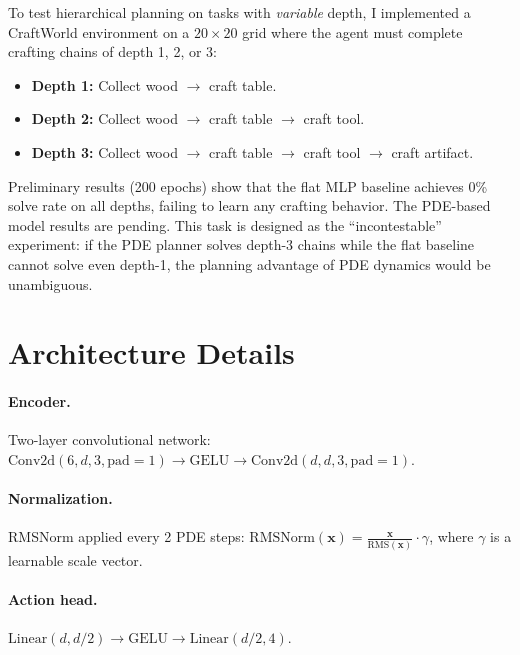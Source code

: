 \documentclass{article}
\begin{document}
\begin{itemize}
To test hierarchical planning on tasks with \emph{variable} depth, I implemented a CraftWorld environment on a $20 \times 20$ grid where the agent must complete crafting chains of depth 1, 2, or 3:

\begin{itemize}
    \item \textbf{Depth 1:} Collect wood $\rightarrow$ craft table.
    \item \textbf{Depth 2:} Collect wood $\rightarrow$ craft table $\rightarrow$ craft tool.
    \item \textbf{Depth 3:} Collect wood $\rightarrow$ craft table $\rightarrow$ craft tool $\rightarrow$ craft artifact.
\end{itemize}

Preliminary results (200 epochs) show that the flat MLP baseline achieves 0\% solve rate on all depths, failing to learn any crafting behavior. The PDE-based model results are pending. This task is designed as the ``incontestable'' experiment: if the PDE planner solves depth-3 chains while the flat baseline cannot solve even depth-1, the planning advantage of PDE dynamics would be unambiguous.

\section{Architecture Details}
\label{app:architecture}

\paragraph{Encoder.} Two-layer convolutional network: $\text{Conv2d}(6, d, 3, \text{pad}=1) \rightarrow \text{GELU} \rightarrow \text{Conv2d}(d, d, 3, \text{pad}=1)$.

\paragraph{Normalization.} RMSNorm applied every 2 PDE steps: $\text{RMSNorm}(\mathbf{x}) = \frac{\mathbf{x}}{\text{RMS}(\mathbf{x})} \cdot \gamma$, where $\gamma$ is a learnable scale vector.

\paragraph{Action head.} $\text{Linear}(d, d/2) \rightarrow \text{GELU} \rightarrow \text{Linear}(d/2, 4)$.


\end{itemize}
\end{document}
